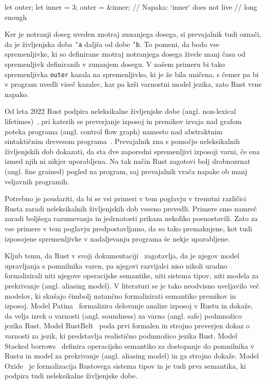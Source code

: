 \begin{rust-failure}
let outer;
{
    let inner = 3;
    outer = &inner;  // Napaka: `inner` does not live
                     // long enough
}
\end{rust-failure}

Ker je notranji doseg uveden znotraj zunanjega dosega, si prevajalnik tudi označi, da je življenjska doba \texttt{'a} daljša od dobe \texttt{'b}. To pomeni, da bodo vse spremenljivke, ki so definirane znotraj notranjega dosega živele manj časa od spremenljivk definiranih v zunanjem dosegu. V našem primeru bi tako spremenljivka \texttt{outer} kazala na spremenljivko, ki je že bila uničena, s čemer pa bi v program uvedli viseč kazalec, kar pa krši varnostni model jezika, zato Rust vrne napako.


Od leta 2022 Rust podpira neleksikalne življenjske dobe (angl. non-lexical lifetimes)~\cite{Matsakis_2018, Matsakis_et_al_2022}, pri katerih se preverjanje izposoj in premikov izvaja nad grafom poteka programa (angl. control flow graph) namesto nad abstraktnim sintaktičnim drevesom programa~\cite{Oxide, StackedBorrows}. Prevajalnik zna s pomočjo neleksikalnih življenjskih dob dokazati, da sta dve zaporedni spremenljivi izposoji varni, če ena izmed njih ni nikjer uporabljena. Na tak način Rust zagotovi bolj drobnozrnat (angl. fine grained) pogled na program, saj prevajalnik vrača napake ob manj veljavnih programih.

Potrebno je poudariti, da bi se vsi primeri v tem poglavju v trenutni različici Rusta zaradi neleksikalnih življenjskih dob vseeno prevedli. Primere smo namreč zaradi boljšega razumevanja in jedrnatosti prikaza nekoliko poenostavili. Zato za vse primere v tem poglavju predpostavljamo, da so tako premaknjene, kot tudi izposojene spremenljivke v nadaljevanju programa še nekje uporabljene.

Kljub temu, da Rust v svoji dokumentaciji~\cite{klabnik2023rust} zagotavlja, da je njegov model upravljanja s pomnilnika varen, pa njegovi razvijalci niso nikoli uradno formalizirali niti njegove operacijske semantike, niti sistema tipov, niti modela za prekrivanje (angl. aliasing model). V literaturi se je tako neodvisno uveljavilo več modelov, ki skušajo čimbolj natančno formalizirati semantiko premikov in izposoj. Model Patina~\cite{reed2015patina} formalizira delovanje analize izposoj v Rustu in dokaže, da velja izrek o varnosti (angl. soundness) za varno (angl. safe) podmnožico jezika Rust. Model RustBelt~\cite{10.1145/3158154} poda prvi formalen in strojno preverjen dokaz o varnosti za jezik, ki predstavlja realistično podmnožico jezika Rust. Model Stacked borrows~\cite{StackedBorrows} definira operacijsko semantiko za dostopanje do pomnilnika v Rustu in model za prekrivanje (angl. aliasing model) in ga strojno dokaže. Model Oxide~\cite{Oxide} je formalizacija Rustovega sistema tipov in je tudi prva semantika, ki podpira tudi neleksikalne življenjske dobe. 